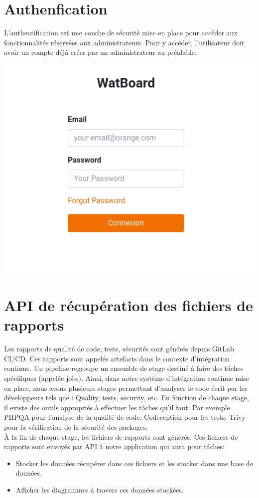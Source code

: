 	\section{Authenfication}
		L'authentification est une couche de sécurité mise en place pour accéder aux fonctionnalités réservées aux administrateurs. Pour y accéder, l’utilisateur doit avoir un compte déjà créer par un administrateur au préalable.
		\begin{center}
			\includegraphics[scale=0.4]{chap_3/authen.png}
			\label{Authenfication}
		\end{center}
	\section{API de récupération des fichiers de rapports}
		Les rapports de qualité de code, tests, sécurités sont générés depuis GitLab CI/CD. 
		Ces rapports sont appelés artefacts dans le contexte d’intégration continue. Un pipeline regroupe un ensemble de stage destiné à faire des tâches spécifiques (appelée jobs). Ainsi, dans notre système d’intégration continue mise en place, nous avons plusieurs stages permettant d’analyser le code écrit par les développeurs tels que : Quality, tests, security, etc.  En fonction de chaque stage, il existe des outils appropriés à effectuer les tâches qu’il faut. Par exemple   PHPQA pour l’analyse de la qualité de code, Codeception pour les tests, Trivy pour la vérification de la sécurité des packages.\\
		À la fin de chaque stage, les fichiers de rapports sont générés. Ces fichiers de rapports sont envoyés par API à notre application qui aura pour tâches:
		\begin{itemize}
			\item Stocker les données récupérer dans ces fichiers et les stocker dans une base de données.
			\item Afficher les diagrammes à travers ces données stockées.
		\end{itemize}  
		
